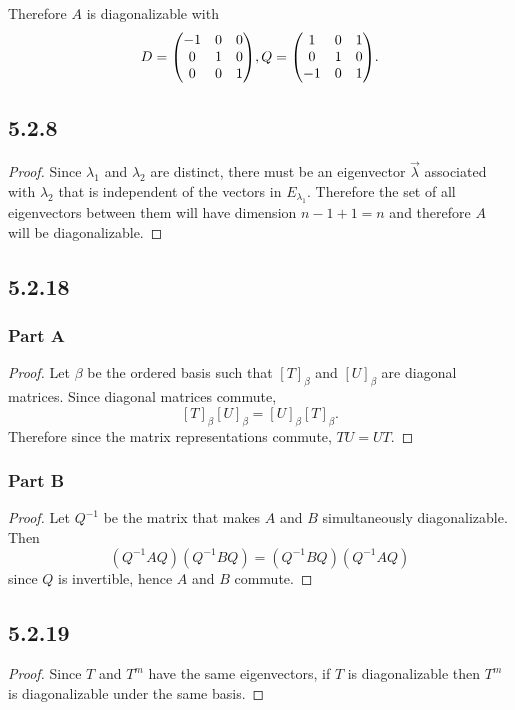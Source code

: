 \documentclass[12pt,titlepage]{extarticle}
\begin{document}
Therefore $A$ is diagonalizable with
\[
    D = \mqty(\dmat[0]{-1,1,1}), Q = \mqty(
    1 & 0 & 1 \\
    0 & 1 & 0 \\
    -1 & 0 & 1 \\
    )
.\]

\subsection*{5.2.8}
\begin{proof}
    Since $\lambda_1$ and $\lambda_2$ are distinct, there must be an eigenvector $\vec{\lambda}$ associated with $\lambda_2$ that is independent of the vectors in $E_{\lambda_1}$. Therefore the set of all eigenvectors between them will have dimension $n - 1 + 1 = n$ and therefore $A$ will be diagonalizable.
\end{proof}

\subsection*{5.2.18}
\subsubsection*{Part A}
\begin{proof}
    Let $\beta$ be the ordered basis such that $[T]_\beta$ and $[U]_{\beta}$ are diagonal matrices. Since diagonal matrices commute,
    \[
        [T]_{\beta} [U]_{\beta} = [U]_{\beta}[T]_{\beta}
    .\]
    Therefore since the matrix representations commute, $TU = UT$.
\end{proof}

\subsubsection*{Part B}
\begin{proof}
    Let $Q^{-1}$ be the matrix that makes $A$ and $B$ simultaneously diagonalizable. Then
    \[
        (Q^{-1} A Q)(Q^{-1} B Q) = (Q^{-1} B Q)(Q^{-1} A Q)
    \]
    since $Q$ is invertible, hence $A$ and $B$ commute.
\end{proof}

\subsection*{5.2.19}
\begin{proof}
    Since $T$ and $T^m$ have the same eigenvectors, if $T$ is diagonalizable then $T^m$ is diagonalizable under the same basis.
\end{proof}
\end{document}
